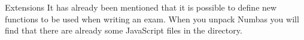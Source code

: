 %
%
%

\begin{chapter}{\label{cha:extensions}Extensions}
  It has already been mentioned that it is possible to define new functions to 
  be used when writing an exam. When you unpack Numbas you will find that there
  are already some JavaScript files in the  directory. 
  

\end{chapter}
